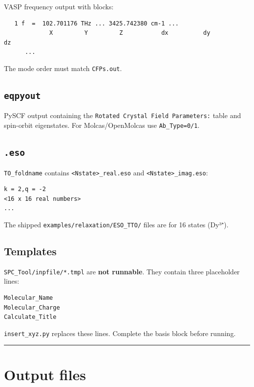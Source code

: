 \documentclass[11pt,a4paper]{article}
\providecommand{\texorpdfstring}[2]{#1}
\begin{document}
VASP frequency output with blocks:

\begin{lstlisting}
   1 f  =  102.701176 THz ... 3425.742380 cm-1 ...
             X         Y         Z           dx          dy          dz
      ...
\end{lstlisting}

The mode order must match \texttt{CFPs.out}.

\subsection{\texorpdfstring{\texttt{eqpyout}}{7.3 eqpyout}}\label{eqpyout}

PySCF output containing the
\texttt{Rotated\ Crystal\ Field\ Parameters:} table and spin-orbit
eigenstates. For Molcas/OpenMolcas use \texttt{Ab\_Type=0/1}.

\subsection{\texorpdfstring{\texttt{.eso}}{7.4 .eso}}\label{eso}

\texttt{TO\_foldname} contains
\texttt{\textless{}Nstate\textgreater{}\_real.eso} and
\texttt{\textless{}Nstate\textgreater{}\_imag.eso}:

\begin{lstlisting}
k = 2,q = -2
<16 x 16 real numbers>
...
\end{lstlisting}

The shipped \texttt{examples/relaxation/ESO\_TTO/} files are for 16
states (Dy³⁺).

\subsection{Templates}\label{templates}

\texttt{SPC\_Tool/inpfile/*.tmpl} are \textbf{not runnable}. They
contain three placeholder lines:

\begin{lstlisting}
Molecular_Name
Molecular_Charge
Calculate_Title
\end{lstlisting}

\texttt{insert\_xyz.py} replaces these lines. Complete the basis block
before running.

\begin{center}\rule{0.5\linewidth}{0.4pt}\end{center}

\section{Output files}\label{output-files}
\end{document}
